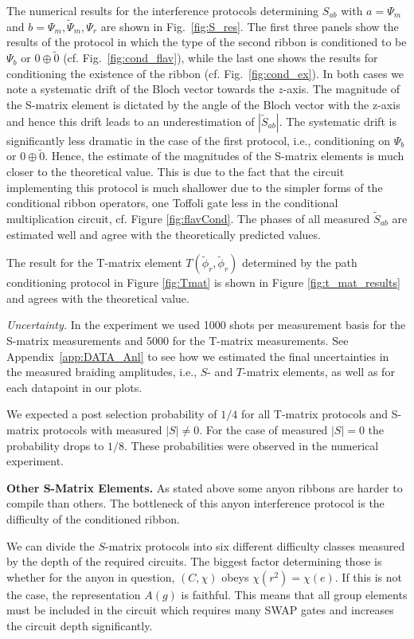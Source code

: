 \documentclass[two column]{article}
\begin{document}
The numerical results for the interference protocols determining $S_{ab}$ with $a=\Psi_m$ and $b=\Psi_m,\tilde \Psi_m, \Psi_r$ are shown in Fig.~\ref{fig:S_res}. The first three panels show the results of the protocol in which the type of the second ribbon is conditioned to be $\Psi_b$ or $0 \oplus \tilde 0$ (cf. Fig.~\ref{fig:cond_flav}), while the last one shows the results for conditioning the existence of the ribbon (cf. Fig.~\ref{fig:cond_ex}). In both cases we note a systematic drift of the Bloch vector towards the $z$-axis. The magnitude of the S-matrix element is dictated by the angle of the Bloch vector with the z-axis and hence this drift leads to an underestimation of $|\tilde S_{ab}|$. The systematic drift is significantly less dramatic in the case of the first protocol, i.e., conditioning on $\Psi_b$ or $0 \oplus \tilde 0$.  Hence, the estimate of the magnitudes of the S-matrix elements is much closer to the theoretical value. 
 This is due to the fact that the circuit implementing this protocol is much shallower due to the simpler forms of the conditional ribbon operators, one Toffoli gate less in the conditional multiplication circuit, cf. Figure \ref{fig:flavCond}. The phases of all measured $\tilde S_{ab}$ are estimated well and agree with the theoretically predicted values.


The result for the T-matrix element $T(\tilde \phi_r, \tilde \phi_r)$ determined by the path conditioning protocol in Figure \ref{fig:Tmat} is shown in Figure \ref{fig:t_mat_results} and agrees with the theoretical value.



\emph{Uncertainty.} In the experiment we used 1000 shots per measurement basis for the S-matrix measurements and 5000 for the T-matrix measurements. See Appendix~\ref{app:DATA_Anl} to see how we estimated the final uncertainties in the measured braiding amplitudes, i.e., $S$- and $T$-matrix elements, as well as for each datapoint in our plots.

We expected a post selection probability of $1/4$ for all T-matrix protocols and S-matrix protocols with measured $|S| \neq 0$. For the case of measured $|S| = 0$ the probability drops to $1/8$. These probabilities were observed in the numerical experiment.

\textbf{Other S-Matrix Elements.}
As stated above some anyon ribbons are harder to compile than others. The bottleneck of this anyon interference protocol is the difficulty of the conditioned ribbon. 

We can divide the $S$-matrix protocols into six different difficulty classes measured by the depth of the required circuits. The biggest factor determining those is whether for the anyon in question, $(C, \chi)$ obeys $\chi(r^2) = \chi(e)$. If this is not the case, the representation $A{(g)}$ is faithful. This means that all group elements must be included in the circuit which requires many SWAP gates and increases the circuit depth significantly.
\end{document}
